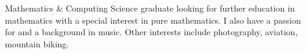 Mathematics \& Computing Science graduate looking for further education in mathematics
with a special interest in pure mathematics.
I also have a passion for and a background in music.
Other interests include photography, aviation, mountain biking.
